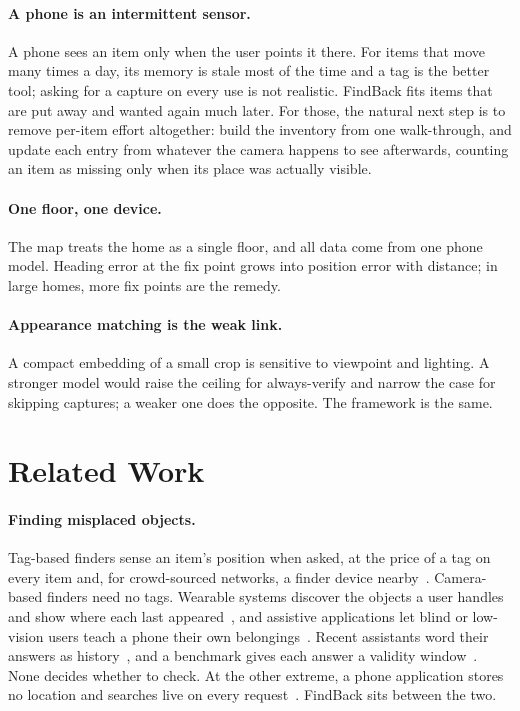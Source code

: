 \documentclass[sigconf,10pt]{acmart}
\newcommand{\sys}{FindBack}
\begin{document}
\paragraph{A phone is an intermittent sensor.}
A phone sees an item only when the user points it there.
For items that move many times a day, its memory is stale most of the time and a tag is the
better tool; asking for a capture on every use is not realistic.
\sys{} fits items that are put away and wanted again much later.
For those, the natural next step is to remove per-item effort altogether: build the inventory
from one walk-through, and update each entry from whatever the camera happens to see afterwards,
counting an item as missing only when its place was actually visible.

\paragraph{One floor, one device.}
The map treats the home as a single floor, and all data come from one phone model.
Heading error at the fix point grows into position error with distance; in large homes, more fix
points are the remedy.

\paragraph{Appearance matching is the weak link.}
A compact embedding of a small crop is sensitive to viewpoint and lighting.
A stronger model would raise the ceiling for always-verify and narrow the case for skipping
captures; a weaker one does the opposite.
The framework is the same.

\section{Related Work}

\paragraph{Finding misplaced objects.}
Tag-based finders sense an item's position when asked, at the price of a tag on every item and,
for crowd-sourced networks, a finder device nearby~\cite{heinrich2021findmy}.
Camera-based finders need no tags.
Wearable systems discover the objects a user handles and show where each last
appeared~\cite{yagi2021gofinder}, and assistive applications let blind or low-vision users teach a
phone their own belongings~\cite{kacorri2017people,morrison2023findmythings}.
Recent assistants word their answers as history~\cite{maniar2025mempal,xie2026linguistic}, and a
benchmark gives each answer a validity window~\cite{forte2026egostream}.
None decides whether to check.
At the other extreme, a phone application stores no location and searches live on every
request~\cite{florea2026visionaid}.
\sys{} sits between the two.
\end{document}
